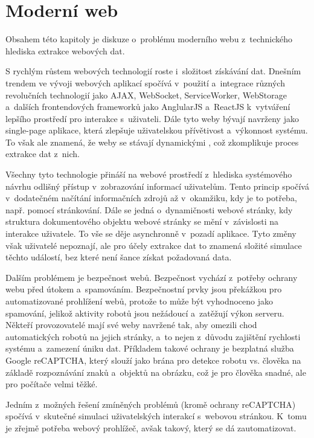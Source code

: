 \documentclass[11pt,a4paper]{article}
\begin{document}
\section{Moderní web}
Obsahem této kapitoly je diskuze o~problému moderního webu z~technického hlediska extrakce webových dat.

S rychlým růstem webových technologií roste i~složitost získávání dat. Dnešním trendem ve vývoji webových aplikací spočívá v~použití a~integrace různých revolučních technologií jako AJAX, WebSocket, ServiceWorker, WebStorage a~dalších frontendových frameworků jako AnglularJS a~ReactJS k~vytváření lepšího prostředí pro interakce s~uživateli. Dále tyto weby bývají navrženy jako single-page aplikace, která zlepšuje uživatelskou přívětivost a~výkonnost systému. To však ale znamená, že weby se stávají dynamickými \cite{kelk}, což zkomplikuje proces extrakce dat z~nich.

Všechny tyto technologie přináší na webové prostředí z~hlediska systémového návrhu odlišný přístup v~zobrazování informací uživatelům. Tento princip spočívá v~dodatečném načítání informačních zdrojů až v~okamžiku, kdy je to potřeba, např. pomocí stránkování. Dále se jedná o~dynamičnosti webové stránky, kdy struktura dokumentového objektu webové stránky se mění v~závislosti na interakce uživatele. To vše se děje asynchronně v~pozadí aplikace. Tyto změny však uživatelé nepoznají, ale pro účely extrakce dat to znamená složité simulace těchto událostí, bez které není šance získat požadovaná data. 

Dalším problémem je bezpečnost webů. Bezpečnost vychází z~potřeby ochrany webu před útokem a~spamováním. Bezpečnostní prvky jsou překážkou pro automatizované prohlížení webů, protože to může být vyhodnoceno jako spamování, jelikož aktivity robotů jsou nežádoucí a~zatěžují výkon serveru. Někteří provozovatelé mají své weby navržené tak, aby omezili chod automatických robotů na jejich stránky, a~to nejen z~důvodu zajištění rychlosti systému a~zamezení úniku dat. Příkladem takové ochrany je bezplatná služba Google reCAPTCHA, který slouží jako brána pro detekce robotu vs. člověka na základě rozpoznávání znaků a~objektů na obrázku, což je pro člověka snadné, ale pro počítače velmi těžké.

Jedním z~možných řešení zmíněných problémů (kromě ochrany reCAPTCHA) spočívá v~skutečné simulaci uživatelských interakcí s~webovou stránkou. K~tomu je zřejmě potřeba webový prohlížeč, avšak takový, který se dá zautomatizovat.
\end{document}
